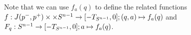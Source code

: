 Note that we can use $f_a(q)$ to define the related functions $f:J(p^-,p^+) \times \times {S^{n-1}} \to [-T_{S^{n-1}},0]; (q,a)\mapsto f_a(q)$ and $F_q:{S^{n-1}} \to [-T_{S^{n-1}},0]; a\mapsto f_a(q)$. 




